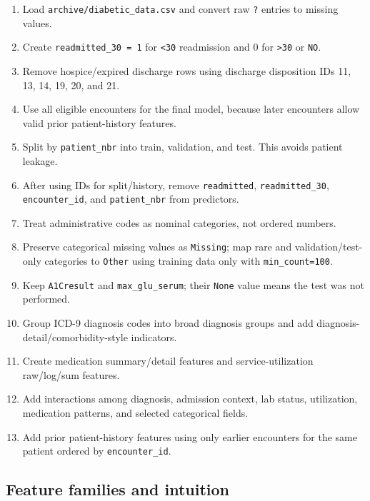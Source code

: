 \documentclass[10pt]{article}
\newcommand{\tightsubsection}[1]{\vspace{2pt}\subsection{#1}\vspace{-3pt}}
\begin{document}
\begin{enumerate}
    \item Load \texttt{archive/diabetic\_data.csv} and convert raw \texttt{?} entries to missing values.
    \item Create \texttt{readmitted\_30 = 1} for \texttt{<30} readmission and 0 for \texttt{>30} or \texttt{NO}.
    \item Remove hospice/expired discharge rows using discharge disposition IDs 11, 13, 14, 19, 20, and 21.
    \item Use all eligible encounters for the final model, because later encounters allow valid prior patient-history features.
    \item Split by \texttt{patient\_nbr} into train, validation, and test. This avoids patient leakage.
    \item After using IDs for split/history, remove \texttt{readmitted}, \texttt{readmitted\_30}, \texttt{encounter\_id}, and \texttt{patient\_nbr} from predictors.
    \item Treat administrative codes as nominal categories, not ordered numbers.
    \item Preserve categorical missing values as \texttt{Missing}; map rare and validation/test-only categories to \texttt{Other} using training data only with \texttt{min\_count=100}.
    \item Keep \texttt{A1Cresult} and \texttt{max\_glu\_serum}; their \texttt{None} value means the test was not performed.
    \item Group ICD-9 diagnosis codes into broad diagnosis groups and add diagnosis-detail/comorbidity-style indicators.
    \item Create medication summary/detail features and service-utilization raw/log/sum features.
    \item Add interactions among diagnosis, admission context, lab status, utilization, medication patterns, and selected categorical fields.
    \item Add prior patient-history features using only earlier encounters for the same patient ordered by \texttt{encounter\_id}.
\end{enumerate}

\tightsubsection{Feature families and intuition}
\end{document}
